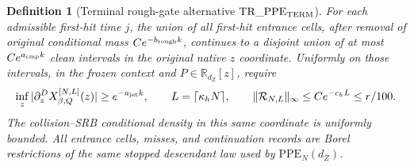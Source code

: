 \documentclass[11pt]{article}
\newtheorem{definition}[theorem]{Definition}
\begin{document}
\begin{definition}[Terminal rough-gate alternative
$\mathrm{TR\_PPE}_{\rm TERM}$]
For each admissible first-hit time $j$, the union of all first-hit entrance
cells, after removal of original conditional mass
$Ce^{-b_{\rm rough}k}$, continues to a disjoint union of at most
$Ce^{a_{\rm cmp}k}$ clean intervals in the original native $z$ coordinate.
Uniformly on those intervals, in the
frozen context and
$P\in\mathbb R_{d_Z}[z]$, require
\begin{equation}
\label{eq:translation-terminal-jet}
 \inf_z|\partial_z^D X^{[N,L]}_{\beta,Q}(z)|
 \ge e^{-a_{\rm jet}k},\qquad
 L=\lceil\kappa_hN\rceil,\qquad
 \|\mathcal R_{N,L}\|_\infty\le Ce^{-c_hL}\le r/100.
\end{equation}
The collision--SRB conditional density in this same coordinate is uniformly
bounded.  All entrance cells, misses, and continuation records are Borel
restrictions of the same stopped descendant law used by
$\mathrm{PPE}_N(d_Z)$.
\end{definition}
\end{document}
